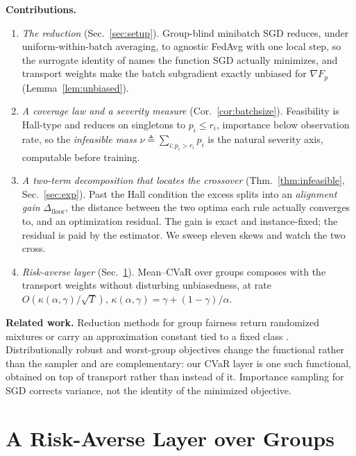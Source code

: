 \documentclass{article}
\theoremstyle{definition}
\begin{document}
\noindent\textbf{Contributions.}
\begin{enumerate}\itemsep0pt\parskip0pt
\item \emph{The reduction} (Sec.~\ref{sec:setup}). Group-blind minibatch SGD reduces, under
uniform-within-batch averaging, to agnostic \textsf{FedAvg} with one local step, so the surrogate identity of
\cite{rahimi2025agnostic} names the function SGD actually minimizes, and
transport weights make the batch subgradient exactly unbiased for $\nabla F_p$
(Lemma~\ref{lem:unbiased}).
\item \emph{A coverage law and a severity measure} (Cor.~\ref{cor:batchsize}).
Feasibility is Hall-type and reduces on singletons to $p_i\le r_i$, importance
below observation rate, so the \emph{infeasible mass}
$\nu\triangleq\sum_{i:p_i>r_i}p_i$ is the natural severity axis, computable
before training.
\item \emph{A two-term decomposition that locates the crossover}
(Thm.~\ref{thm:infeasible}, Sec.~\ref{sec:exp}). Past the Hall condition the
excess splits into an \emph{alignment gain} $\Delta_{\mathrm{floor}}$, the
distance between the two optima each rule actually converges to, and an
optimization residual. The gain is exact and instance-fixed; the residual is
paid by the estimator. We sweep eleven skews and watch the two cross.
\item \emph{Risk-averse layer} (Sec.~\ref{sec:cvar}). Mean--CVaR over groups
composes with the transport weights without disturbing unbiasedness, at rate
$O(\kappa(\alpha,\gamma)/\sqrt{T})$,
$\kappa(\alpha,\gamma)=\gamma+(1-\gamma)/\alpha$.
\end{enumerate}

\noindent\textbf{Related work.}
Reduction methods for group fairness return randomized mixtures or carry an
approximation constant tied to a fixed class
\cite{agarwal2018reductions,cotter2019twoplayer,chamon2020pacc}.
Distributionally robust and worst-group objectives
\cite{sagawa2020dro,hashimoto2018repeated,levy2020large} change the functional
rather than the sampler and are complementary: our CVaR layer is one such
functional, obtained on top of transport rather than instead of it. Importance
sampling for SGD \cite{rizk2021importance,katharopoulos2018not} corrects
variance, not the identity of the minimized objective.




\section{A Risk-Averse Layer over Groups}
\label{sec:cvar}
\end{document}
